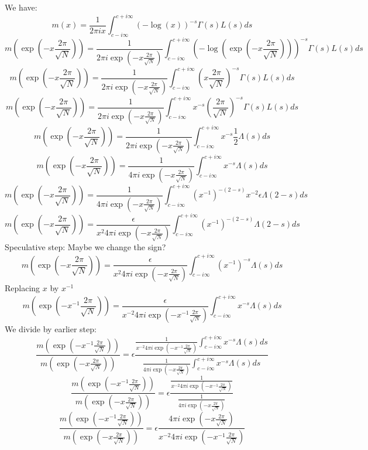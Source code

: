 \documentclass[a4paper]{amsart}
\begin{document}
We have:
$$m(x) = \frac{1}{2\pi i x} \int_{c - i\infty}^{c + i\infty}(-\log(x))^{-s} \Gamma(s)L(s)ds$$
$$m(\exp\left(-x\frac{2\pi}{\sqrt{N}}\right)) = \frac{1}{2\pi i \exp\left(-x\frac{2\pi}{\sqrt{N}}\right)} \int_{c - i\infty}^{c + i\infty}(-\log(\exp\left(-x\frac{2\pi}{\sqrt{N}}\right)))^{-s} \Gamma(s)L(s)ds$$
$$m(\exp\left(-x\frac{2\pi}{\sqrt{N}}\right)) = \frac{1}{2\pi i \exp\left(-x\frac{2\pi}{\sqrt{N}}\right)} \int_{c - i\infty}^{c + i\infty}(x\frac{2\pi}{\sqrt{N}})^{-s} \Gamma(s)L(s)ds$$
$$m(\exp\left(-x\frac{2\pi}{\sqrt{N}}\right)) = \frac{1}{2\pi i \exp\left(-x\frac{2\pi}{\sqrt{N}}\right)} \int_{c - i\infty}^{c + i\infty}x^{-s}(\frac{2\pi}{\sqrt{N}})^{-s} \Gamma(s)L(s)ds$$
$$m(\exp\left(-x\frac{2\pi}{\sqrt{N}}\right)) = \frac{1}{2\pi i \exp\left(-x\frac{2\pi}{\sqrt{N}}\right)} \int_{c - i\infty}^{c + i\infty}x^{-s}\frac{1}{2}\Lambda(s)ds$$
$$m(\exp\left(-x\frac{2\pi}{\sqrt{N}}\right)) = \frac{1}{4\pi i \exp\left(-x\frac{2\pi}{\sqrt{N}}\right)} \int_{c - i\infty}^{c + i\infty}x^{-s}\Lambda(s)ds$$
$$m(\exp\left(-x\frac{2\pi}{\sqrt{N}}\right)) = \frac{1}{4\pi i \exp\left(-x\frac{2\pi}{\sqrt{N}}\right)} \int_{c - i\infty}^{c + i\infty}(x^{-1})^{-(2 - s)} x^{-2}\epsilon\Lambda(2 - s)ds$$
$$m(\exp\left(-x\frac{2\pi}{\sqrt{N}}\right)) = \frac{\epsilon}{x^{2}4\pi i \exp\left(-x\frac{2\pi}{\sqrt{N}}\right)} \int_{c - i\infty}^{c + i\infty}(x^{-1})^{-(2 - s)}\Lambda(2 - s)ds$$
Speculative step: Maybe we change the sign?
$$m(\exp\left(-x\frac{2\pi}{\sqrt{N}}\right)) = \frac{\epsilon}{x^{2}4\pi i \exp\left(-x\frac{2\pi}{\sqrt{N}}\right)} \int_{c - i\infty}^{c + i\infty}(x^{-1})^{-s}\Lambda(s)ds$$
Replacing $x$ by $x^{-1}$
$$m(\exp\left(-x^{-1}\frac{2\pi}{\sqrt{N}}\right)) = \frac{\epsilon}{x^{-2}4\pi i \exp\left(-x^{-1}\frac{2\pi}{\sqrt{N}}\right)} \int_{c - i\infty}^{c + i\infty}x^{-s}\Lambda(s)ds$$
We divide by earlier step:
$$\frac{m(\exp\left(-x^{-1}\frac{2\pi}{\sqrt{N}}\right))}{m(\exp\left(-x\frac{2\pi}{\sqrt{N}}\right))} = \epsilon \frac{\frac{1}{x^{-2}4\pi i \exp\left(-x^{-1}\frac{2\pi}{\sqrt{N}}\right)} \int_{c - i\infty}^{c + i\infty}x^{-s}\Lambda(s)ds}{\frac{1}{4\pi i \exp\left(-x\frac{2\pi}{\sqrt{N}}\right)} \int_{c - i\infty}^{c + i\infty}x^{-s}\Lambda(s)ds}$$
$$\frac{m(\exp\left(-x^{-1}\frac{2\pi}{\sqrt{N}}\right))}{m(\exp\left(-x\frac{2\pi}{\sqrt{N}}\right))} = \epsilon \frac{\frac{1}{x^{-2}4\pi i \exp\left(-x^{-1}\frac{2\pi}{\sqrt{N}}\right)} }{\frac{1}{4\pi i \exp\left(-x\frac{2\pi}{\sqrt{N}}\right)}}$$
$$\frac{m(\exp\left(-x^{-1}\frac{2\pi}{\sqrt{N}}\right))}{m(\exp\left(-x\frac{2\pi}{\sqrt{N}}\right))} = \epsilon\frac{4\pi i \exp\left(-x\frac{2\pi}{\sqrt{N}}\right)}{x^{-2}4\pi i \exp\left(-x^{-1}\frac{2\pi}{\sqrt{N}}\right)}$$
\end{document}
